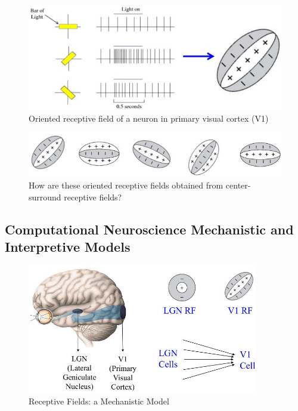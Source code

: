\documentclass[]{article}
\begin{document}
\begin{figure}[H]
	\caption{Oriented receptive field of a neuron in primary visual cortex (V1)}
	\includegraphics[width=\textwidth]{orientation-preference}
\end{figure}

\begin{figure}[H]
	\caption[How are these oriented receptive fields obtained?]{How are these oriented receptive fields obtained from center-surround receptive fields?}\label{fig:rf-shape}
	\includegraphics[width=\textwidth]{orientation-preference2}
\end{figure}

\subsection{Computational Neuroscience Mechanistic and Interpretive Models}


\begin{figure}[H]
	\caption[Receptive Fields: a Mechanistic Model]{Receptive Fields: a Mechanistic Model}
	\includegraphics[width=0.9\textwidth]{mech-rf}
\end{figure}
\end{document}
